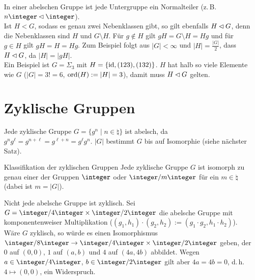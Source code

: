 \begin{Bsp}
    In einer abelschen Gruppe ist jede Untergruppe ein Normalteiler
    (z.\,B. $n\integer \nt \integer$).\\
    Ist $H < G$, sodass es genau zwei Nebenklassen gibt, so gilt ebenfalls
    $H \mathbin{\vartriangleleft} G$, denn die Nebenklassen sind $H$ und $G \setminus H$.
    Für $g \notin H$ gilt $gH = G \setminus H = Hg$ und
    für $g \in H$ gilt $gH = H = Hg$.
    Zum Beispiel folgt aus $|G| < \infty$ und $|H| = \frac{|G|}{2}$, dass
    $H \mathbin{\vartriangleleft} G$, da $|H| = |gH|$.\\
    Ein Beispiel ist $G = \Sigma_3$ mit $H = \{\operatorname{id}, (123), (132)\}$.
    $H$ hat halb so viele Elemente wie $G$ ($|G| = 3! = 6$,
    $\operatorname{ord}(H) := |H| = 3$), damit muss $H \mathbin{\vartriangleleft} G$ gelten.
\end{Bsp}

\pagebreak

\section{%
    Zyklische Gruppen%
}

\begin{Bem}
    Jede zyklische Gruppe $G = \{g^n \;|\; n \in \natural\}$
    ist abelsch, da\\
    $g^n g^\ell = g^{n+\ell} = g^{\ell+n} = g^\ell g^n$.
    $|G|$ bestimmt $G$ bis auf Isomorphie (siehe nächster Satz).
\end{Bem}

\begin{Satz}{Klassifikation der zyklischen Gruppen}
    Jede zyklische Gruppe $G$ ist isomorph zu genau einer der Gruppen
    $\integer$ oder $\integer/m\integer$ für ein $m \in \natural$
    (dabei ist $m = |G|$).
\end{Satz}

\begin{Bsp}
    Nicht jede abelsche Gruppe ist zyklisch.
    Sei $G = \integer/4\integer \times \integer/2\integer$
    die abelsche Gruppe mit komponentenweiser Multiplikation
    ($(g_1, h_1) \cdot (g_2, h_2) := (g_1 \cdot g_2, h_1 \cdot h_2)$).
    Wäre $G$ zyklisch, so würde es einen Isomorphismus
    $\integer/8\integer \rightarrow \integer/4\integer \times
    \integer/2\integer$ geben, der $0$ auf $(0, 0)$,
    $1$ auf $(a, b)$ und $4$ auf $(4a, 4b)$ abbildet.
    Wegen $a \in \integer/4\integer$, $b \in \integer/2\integer$ gilt
    aber $4a = 4b = 0$, d.\,h. $4 \mapsto (0, 0)$, ein Widerspruch.
\end{Bsp}

